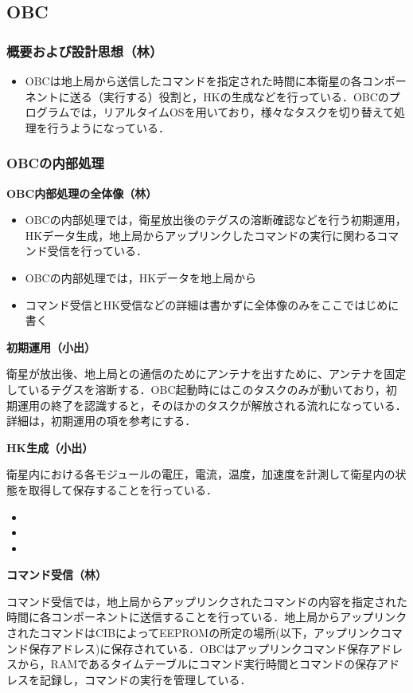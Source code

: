 
\subsection{OBC}
\subsubsection{概要および設計思想（林）}
\begin{itemize}
	\item OBCは地上局から送信したコマンドを指定された時間に本衛星の各コンポーネントに送る（実行する）役割と，HKの生成などを行っている．OBCのプログラムでは，リアルタイムOSを用いており，様々なタスクを切り替えて処理を行うようになっている．
\end{itemize}
\subsubsection{OBCの内部処理}
\textbf{OBC内部処理の全体像（林）}\par
\begin{itemize}
	\item OBCの内部処理では，衛星放出後のテグスの溶断確認などを行う初期運用，HKデータ生成，地上局からアップリンクしたコマンドの実行に関わるコマンド受信を行っている．
	\item OBCの内部処理では，HKデータを地上局から
	\item コマンド受信とHK受信などの詳細は書かずに全体像のみをここではじめに書く
\end{itemize}\par
\textbf{初期運用（小出）}\par
衛星が放出後、地上局との通信のためにアンテナを出すために、アンテナを固定しているテグスを溶断する．OBC起動時にはこのタスクのみが動いており，初期運用の終了を認識すると，そのほかのタスクが解放される流れになっている．
詳細は，初期運用の項を参考にする．\par
\textbf{HK生成（小出）}\par
衛星内における各モジュールの電圧，電流，温度，加速度を計測して衛星内の状態を取得して保存することを行っている．
\begin{itemize}
	\item 
	\item 
	\item 
\end{itemize}
\textbf{コマンド受信（林）}\par
コマンド受信では，地上局からアップリンクされたコマンドの内容を指定された時間に各コンポーネントに送信することを行っている．地上局からアップリンクされたコマンドはCIBによってEEPROMの所定の場所(以下，アップリンクコマンド保存アドレス)に保存されている．OBCはアップリンクコマンド保存アドレスから，RAMであるタイムテーブルにコマンド実行時間とコマンドの保存アドレスを記録し，コマンドの実行を管理している．
